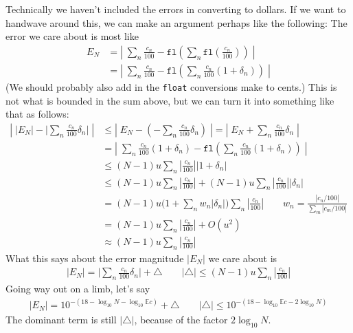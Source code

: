 \documentclass[11pt, oneside]{amsart}   	%
\begin{document}
Technically we haven't included the errors in converting to dollars. If we want to handwave around this, we can make an argument perhaps like the following: The error we care about is most like
\begin{align*}
    E_N &= \left| \; \sum_n \frac{c_n}{100} - \texttt{fl}\left(\sum_n \texttt{fl}\left(\frac{c_n}{100}\right)\right) \; \right| \\
        &= \left| \; \sum_n \frac{c_n}{100} - \texttt{fl}\left(\sum_n \frac{c_n}{100}(1+\delta_n)\right) \; \right|
\end{align*}
(We should probably also add in the \texttt{float} conversions make to cents.) This is not what is bounded in the sum above, but we can turn it into something like that as follows: 
\begin{align*}
    \left| \; | E_N | - \Bigg| \sum_n \frac{c_n}{100}\delta_n \Bigg| \; \right|
        &\leq \left| \; E_N - \left( - \sum_n \frac{c_n}{100}\delta_n \right) \; \right|
        = \left| \; E_N + \sum_n \frac{c_n}{100}\delta_n \; \right| \\
        &= \left| \; \sum_n \frac{c_n}{100}(1+\delta_n) - \texttt{fl}\left(\sum_n \frac{c_n}{100}(1+\delta_n)\right) \; \right|  \\
        &\leq (N-1)u \sum_n \left | \frac{c_n}{100} \right ||1+\delta_n| \\
        &\leq (N-1)u \sum_n \left | \frac{c_n}{100} \right | 
                + (N-1)u \sum_n \left | \frac{c_n}{100} \right | | \delta_n| \\
        &= (N-1)u \Bigg( 1 + \sum_n w_n | \delta_n| \Bigg) \sum_n \left | \frac{c_n}{100} \right |
        \quad\quad
        w_n = \frac{| c_n/100 |}{\sum_m | c_m/100 | }
        \\
        &= (N-1)u \sum_n \left | \frac{c_n}{100} \right | + O(u^2) \\
        &\approx (N-1)u \sum_n \left | \frac{c_n}{100} \right |
\end{align*}
What this says about the error magnitude $|E_N|$ we care about is
\begin{align*}
    |E_N| = \Bigg| \sum_n \frac{c_n}{100}\delta_n \Bigg| + \triangle
    \quad\quad
    |\triangle| \leq (N-1)u \sum_n \left | \frac{c_n}{100} \right |
\end{align*}
Going way out on a limb, let's say 
\begin{align*}
    |E_N| = 10^{-( 18 - \log_{10}N - \log_{10}\mathbb{E}c )} + \triangle
    \quad\quad
    |\triangle| \leq 10^{-( 18-\log_{10}\mathbb{E}c - 2\log_{10}N)}
\end{align*}
The dominant term is still $|\triangle|$, because of the factor $2\log_{10}N$. 
\end{document}
